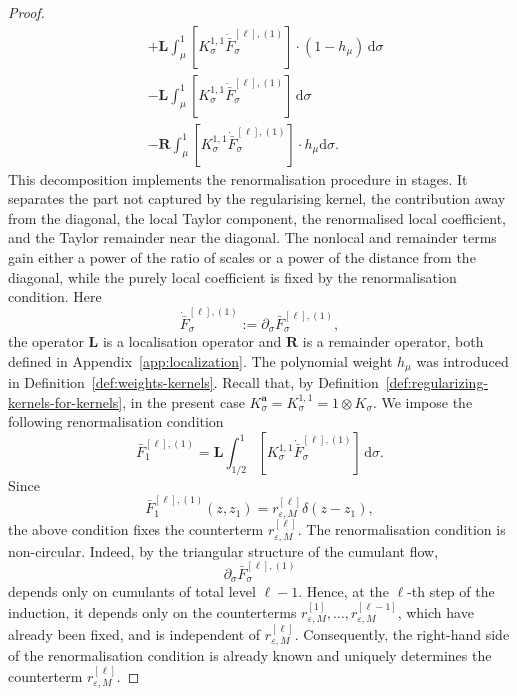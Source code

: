 \documentclass{article}
\numberwithin{equation}{section}
\newcommand{\assign}{:=}
\newcommand{\mathd}{\mathrm{d}}
\theoremstyle{plain}
\theoremstyle{definition}
\begin{document}
\begin{proof}
\begin{equation}
\begin{aligned}
      & + \boldsymbol{L} \int_{\mu}^1 [K^{1, 1}_{\sigma}
      \dot{\bar{F}}_{\sigma}^{[\ell], (1)}] \cdot (1 - h_{\mu})\,\mathd \sigma
      \\&- \boldsymbol{L} \int_{\mu}^1 [K^{1, 1}_{\sigma}
      \dot{\bar{F}}_{\sigma}^{[\ell], (1)}]\,\mathd \sigma\\
      & - \boldsymbol{R} \int_{\mu}^1 [K^{1, 1}_{\sigma}
      \dot{\bar{F}}_{\sigma}^{[\ell], (1)}] \cdot h_{\mu} \mathd \sigma .
    \end{aligned} \label{eq:flow-decomposition}
  \end{equation}
  This decomposition implements the renormalisation procedure in stages. It
  separates the part not captured by the regularising kernel, the contribution
  away from the diagonal, the local Taylor component, the renormalised local
  coefficient, and the Taylor remainder near the diagonal. The nonlocal and
  remainder terms gain either a power of the ratio of scales or a power of the
  distance from the diagonal, while the purely local coefficient is fixed by
  the renormalisation condition.
  Here
  \[ \dot{\bar{F}}_{\sigma}^{[\ell], (1)} \assign \partial_{\sigma}
     \bar{F}_\sigma^{[\ell], (1)}, \]
  the operator $\boldsymbol{L}$ is a localisation operator and
  $\boldsymbol{R}$ is a remainder operator, both defined in
  Appendix~\ref{app:localization}. The
  polynomial weight $h_{\mu}$ was introduced in
  Definition~\ref{def:weights-kernels}. Recall that, by
  Definition~\ref{def:regularizing-kernels-for-kernels}, in the present case
  $K_{\sigma}^{\boldsymbol{a}} = K^{1, 1}_{\sigma} = 1 \otimes K_{\sigma}$. We
  impose the following renormalisation condition
  \begin{equation}\label{eq:ren-cond} \bar{F}_1^{[\ell], (1)} =  \boldsymbol{L} \int_{1 / 2}^1 [K^{1,
     1}_{\sigma} \dot{\bar{F}}_{\sigma}^{[\ell], (1)}]\,\mathd \sigma . \end{equation}
   Since
  \[
  \bar F^{[\ell],(1)}_1(z,z_1)
  =r^{[\ell]}_{\varepsilon,M}\delta(z-z_1),
  \] the above condition fixes the
  counterterm $r^{[\ell]}_{\varepsilon, M}$.  
  The renormalisation condition is non-circular. Indeed, by the triangular
  structure of the cumulant flow,
  \[
  \partial_\sigma \bar F_\sigma^{[\ell],(1)}
  \]
  depends only on cumulants of total level $\ell-1$. Hence, at the $\ell$-th
  step of the induction, it depends only on the counterterms
  $r_{\varepsilon,M}^{[1]},\ldots,r_{\varepsilon,M}^{[\ell-1]}$, which have
  already been fixed, and is independent of $r_{\varepsilon,M}^{[\ell]}$.
  Consequently, the right-hand side of the renormalisation condition is already
  known and uniquely determines the counterterm
  $r_{\varepsilon,M}^{[\ell]}$.
  

\end{proof}
\end{document}
